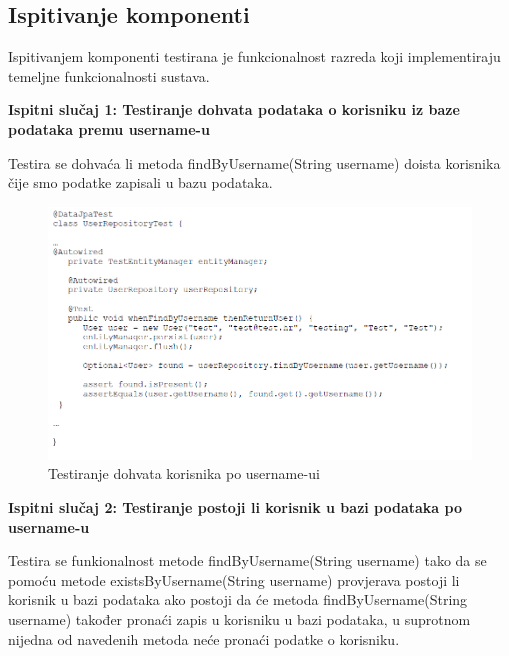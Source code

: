 			\subsection{Ispitivanje komponenti}
			Ispitivanjem komponenti testirana je funkcionalnost razreda koji implementiraju temeljne funkcionalnosti sustava.
			
			\textbf{Ispitni slučaj 1: Testiranje dohvata podataka o korisniku iz baze podataka premu username-u}
			
			Testira se dohvaća li metoda findByUsername(String username) doista korisnika čije smo podatke zapisali u bazu podataka.
			
			
			
			\begin{figure}[H]
				\includegraphics[scale=0.7]{slike/test1.PNG} %
				\centering
				\caption{Testiranje dohvata korisnika po username-ui}
				\label{fig:test1}
			\end{figure}
			
			
			
			
			
				\textbf{Ispitni slučaj 2: Testiranje postoji li korisnik u bazi podataka po username-u}
				
			Testira se funkionalnost metode findByUsername(String username) tako da se pomoću metode existsByUsername(String username) provjerava postoji li korisnik u bazi podataka ako postoji da će
			metoda findByUsername(String username) također pronaći zapis u korisniku u bazi podataka, u suprotnom nijedna od navedenih metoda neće pronaći podatke o korisniku.
				
